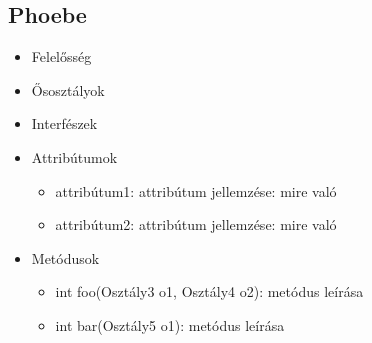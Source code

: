 \subsection{Phoebe}
\begin{itemize}
\item Felelősség\\
\item Ősosztályok\\
\item Interfészek\\
\item Attribútumok\\
	\begin{itemize}
		\item attribútum1: attribútum jellemzése: mire való
		\item attribútum2: attribútum jellemzése: mire való
	\end{itemize}
\item Metódusok\\
	\begin{itemize}
		\item int foo(Osztály3 o1, Osztály4 o2): metódus leírása
		\item int bar(Osztály5 o1): metódus leírása
	\end{itemize}
\end{itemize}

